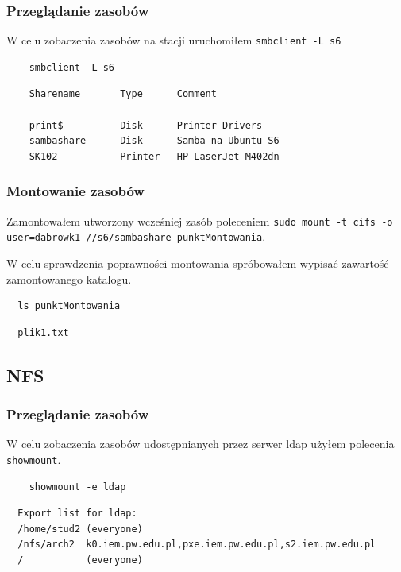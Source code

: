 \documentclass{article} %
\begin{document}
\subsubsection{Przeglądanie zasobów}
W celu zobaczenia zasobów na stacji uruchomiłem \texttt{smbclient -L s6}
\begin{tcolorbox}[colback=yellow!10!white,colframe=red!45!black,coltitle=yellow!100!black, title=Ubuntu]
  \begin{lstlisting}
    smbclient -L s6
  \end{lstlisting}
  \tcblower
  \footnotesize
  \begin{lstlisting}
    Sharename       Type      Comment
    ---------       ----      -------
    print$          Disk      Printer Drivers
    sambashare      Disk      Samba na Ubuntu S6
    SK102           Printer   HP LaserJet M402dn
  \end{lstlisting}
\end{tcolorbox}
\normalsize

\subsubsection{Montowanie zasobów}
Zamontowałem utworzony wcześniej zasób poleceniem \texttt{sudo mount -t cifs -o user=dabrowk1 //s6/sambashare punktMontowania}.

W celu sprawdzenia poprawności montowania spróbowałem wypisać zawartość zamontowanego katalogu.
\begin{tcolorbox}[colback=yellow!10!white,colframe=red!45!black,coltitle=yellow!100!black, title=Ubuntu]
  \begin{lstlisting}
  ls punktMontowania
  \end{lstlisting}
  \tcblower
  \footnotesize
  \begin{lstlisting}
  plik1.txt
  \end{lstlisting}
\end{tcolorbox}
\normalsize

\subsection{NFS}

\subsubsection{Przeglądanie zasobów}
W celu zobaczenia zasobów udostępnianych przez serwer ldap użyłem polecenia \texttt{showmount}.
\begin{tcolorbox}[colback=yellow!10!white,colframe=red!45!black,coltitle=yellow!100!black, title=Ubuntu]
  \begin{lstlisting}
    showmount -e ldap
  \end{lstlisting}
  \tcblower
  \footnotesize
  \begin{lstlisting}
  Export list for ldap:
  /home/stud2 (everyone)
  /nfs/arch2  k0.iem.pw.edu.pl,pxe.iem.pw.edu.pl,s2.iem.pw.edu.pl
  /           (everyone)
  \end{lstlisting}
\end{tcolorbox}
\normalsize
\end{document}
